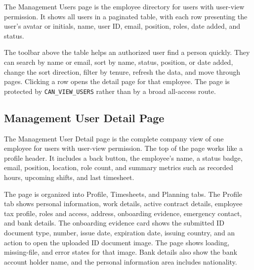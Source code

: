 \documentclass[11pt]{article}
\newcommand{\code}[1]{\nolinkurl{#1}}
\begin{document}
The Management Users page is the employee directory for users with user-view permission. It shows all users in a paginated table, with each row presenting the user's avatar or initials, name, user ID, email, position, roles, date added, and status.

The toolbar above the table helps an authorized user find a person quickly. They can search by name or email, sort by name, status, position, or date added, change the sort direction, filter by tenure, refresh the data, and move through pages. Clicking a row opens the detail page for that employee. The page is protected by \code{CAN_VIEW_USERS} rather than by a broad all-access route.
\subsection{Management User Detail Page}

The Management User Detail page is the complete company view of one employee for users with user-view permission. The top of the page works like a profile header. It includes a back button, the employee's name, a status badge, email, position, location, role count, and summary metrics such as recorded hours, upcoming shifts, and last timesheet.

The page is organized into Profile, Timesheets, and Planning tabs. The Profile tab shows personal information, work details, active contract details, employee tax profile, roles and access, address, onboarding evidence, emergency contact, and bank details. The onboarding evidence card shows the submitted ID document type, number, issue date, expiration date, issuing country, and an action to open the uploaded ID document image. The page shows loading, missing-file, and error states for that image. Bank details also show the bank account holder name, and the personal information area includes nationality.
\end{document}
